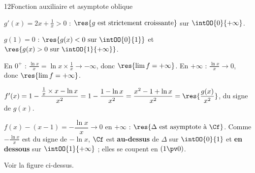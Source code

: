 \begin{corrige}{12}{Fonction auxiliaire et asymptote oblique}
\begin{questions}
  \item $g'(x)=2x+\frac1x>0$ : $\res{g\text{ est strictement croissante}}$ sur $\intOO{0}{+\infty}$.
  \item $g(1)=0$ : $\res{g(x)<0\text{ sur }\intOO{0}{1}}$ et $\res{g(x)>0\text{ sur }\intOO{1}{+\infty}}$.
\end{questions}
\begin{questions}[resume]
  \item En $0^{+}$ : $\frac{\ln x}{x}=\ln x\times\frac1x\to-\infty$, donc $\res{\lim f=+\infty}$. En $+\infty$ : $\frac{\ln x}{x}\to0$, donc $\res{\lim f=+\infty}$.
  \item $f'(x)=1-\dfrac{\frac1x\times x-\ln x}{x^{2}}=1-\dfrac{1-\ln x}{x^{2}}=\dfrac{x^{2}-1+\ln x}{x^{2}}=\res{\dfrac{g(x)}{x^{2}}}$, du signe de $g(x)$.
\end{questions}
\noindent
\begin{minipage}[c]{0.46\linewidth}
\centering
\begin{tableau}
\end{tableau}
\end{minipage}\hfill
\begin{minipage}[c]{0.5\linewidth}
\centering
{}
\end{minipage}
\begin{questions}[start=5]
  \item $f(x)-(x-1)=-\dfrac{\ln x}{x}\to0$ en $+\infty$ : $\res{\Delta\text{ est asymptote à }\Cf}$. Comme $-\frac{\ln x}{x}$ est du signe de
    $-\ln x$, $\Cf$ est \textbf{au-dessus} de $\Delta$ sur $\intOO{0}{1}$ et \textbf{en dessous} sur $\intOO{1}{+\infty}$ ; elles se coupent en $(1\pv0)$.
  \item Voir la figure ci-dessus.
\end{questions}
\end{corrige}

